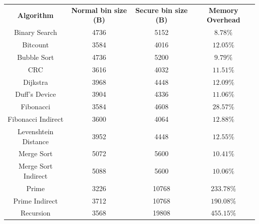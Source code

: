 \begin{table}
  \centering
  \begin{tabular}{|c|c|c|c|}
    \hline
    \textbf{Algorithm}          & \textbf{Normal bin size (B)} & \textbf{Secure bin size (B)} & \textbf{Memory Overhead} \\
    \hhline{====} Binary Search & 4736                         & 5152                         & $8.78\%$                 \\
    \hline
    Bitcount                    & 3584                         & 4016                         & $12.05\%$                \\
    \hline
    Bubble Sort                 & 4736                         & 5200                         & $9.79\%$                 \\
    \hline
    CRC                         & 3616                         & 4032                         & $11.51\%$                \\
    \hline
    Dijkstra                    & 3968                         & 4448                         & $12.09\%$                \\
    \hline
    Duff's Device               & 3904                         & 4336                         & $11.06\%$                \\
    \hline
    Fibonacci                   & 3584                         & 4608                         & $28.57\%$                \\
    \hline
    Fibonacci Indirect          & 3600                         & 4064                         & $12.88\%$                \\
    \hline
    Levenshtein Distance        & 3952                         & 4448                         & $12.55\%$                \\
    \hline
    Merge Sort                  & 5072                         & 5600                         & $10.41\%$                \\
    \hline
    Merge Sort Indirect         & 5088                         & 5600                         & $10.06\%$                \\
    \hline
    Prime                       & 3226                         & 10768                        & $233.78\%$               \\
    \hline
    Prime Indirect              & 3712                         & 10768                        & $190.08\%$               \\
    \hline
    Recursion                   & 3568                         & 19808                        & $455.15\%$               \\

\end{tabular}
\end{table}
